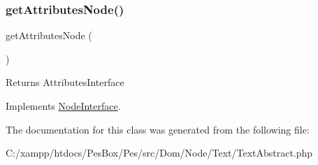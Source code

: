 \subsubsection{\texorpdfstring{get\+Attributes\+Node()}{getAttributesNode()}}
{\footnotesize\ttfamily get\+Attributes\+Node (\begin{DoxyParamCaption}{ }\end{DoxyParamCaption})}

\begin{DoxyReturn}{Returns}
Attributes\+Interface 
\end{DoxyReturn}


Implements \mbox{\hyperlink{interface_pes_1_1_dom_1_1_node_1_1_node_interface_a4722e7722b245351681b05d35f6694f3}{Node\+Interface}}.



The documentation for this class was generated from the following file\+:\begin{DoxyCompactItemize}
\item 
C\+:/xampp/htdocs/\+Pes\+Box/\+Pes/src/\+Dom/\+Node/\+Text/Text\+Abstract.\+php\end{DoxyCompactItemize}
